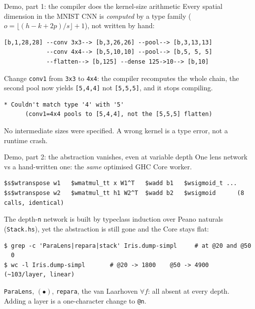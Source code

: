 \documentclass[aspectratio=169,11pt]{beamer}
\begin{document}
\begin{frame}[fragile]{Demo, part 1: the compiler does the kernel-size arithmetic}
  \small Every spatial dimension in the MNIST CNN is \emph{computed} by a type family
  ($o=\lfloor(h-k+2p)/s\rfloor+1$), not written by hand:
\begin{lstlisting}[basicstyle=\ttfamily\footnotesize]
[b,1,28,28] --conv 3x3--> [b,3,26,26] --pool--> [b,3,13,13]
            --conv 4x4--> [b,5,10,10] --pool--> [b,5, 5, 5]
            --flatten--> [b,125] --dense 125->10--> [b,10]
\end{lstlisting}
  \footnotesize Change \texttt{conv1} from \texttt{3x3} to \texttt{4x4}: the compiler recomputes the
  whole chain, the second pool now yields \texttt{[5,4,4]} not \texttt{[5,5,5]}, and it stops compiling.
\begin{lstlisting}[basicstyle=\ttfamily\footnotesize,backgroundcolor=\color{accent!8},keywordstyle=\color{accent}]
  * Couldn't match type '4' with '5'
      (conv1=4x4 pools to [5,4,4], not the [5,5,5] flatten)
\end{lstlisting}
  \centering\footnotesize No intermediate sizes were specified. A wrong kernel is a type error,
  not a runtime crash.
\end{frame}


\begin{frame}[fragile]{Demo, part 2: the abstraction vanishes, even at variable depth}
  \small One lens network vs a hand-written one: the \emph{same} optimised GHC Core worker.
\begin{lstlisting}[basicstyle=\ttfamily\scriptsize]
$s$wtranspose w1   $wmatmul_tt x W1^T   $wadd b1   $wsigmoid_t ...
$s$wtranspose w2   $wmatmul_tt h1 W2^T  $wadd b2   $wsigmoid      (8 calls, identical)
\end{lstlisting}
  \footnotesize The depth-\texttt{n} network is built by typeclass induction over Peano naturals
  (\texttt{Stack.hs}), yet the abstraction is still gone and the Core stays flat:
\begin{lstlisting}[basicstyle=\ttfamily\footnotesize]
$ grep -c 'ParaLens|repara|stack' Iris.dump-simpl     # at @20 and @50
  0
$ wc -l Iris.dump-simpl       # @20 -> 1800    @50 -> 4900   (~103/layer, linear)
\end{lstlisting}
  \centering\footnotesize \texttt{ParaLens}, $(\bullet)$, \texttt{repara}, the van Laarhoven
  $\forall f$: all absent at every depth. Adding a layer is a one-character change to \texttt{@n}.
\end{frame}
\end{document}
